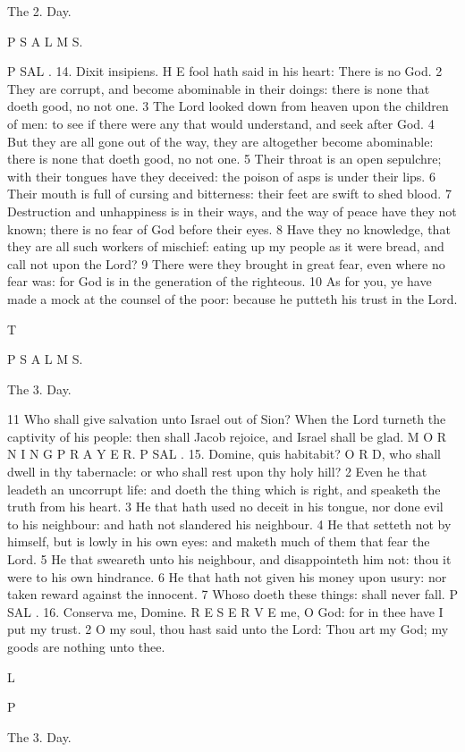 The 2. Day.

P S A L M S.

P SAL . 14. Dixit insipiens. H E fool hath said in his heart: There is no God. 2 They are corrupt, and become abominable in their doings: there is none that doeth good, no not one. 3 The Lord looked down from heaven upon the children of men: to see if there were any that would understand, and seek after God. 4 But they are all gone out of the way, they are altogether become abominable: there is none that doeth good, no not one. 5 Their throat is an open sepulchre; with their tongues have they deceived: the poison of asps is under their lips. 6 Their mouth is full of cursing and bitterness: their feet are swift to shed blood. 7 Destruction and unhappiness is in their ways, and the way of peace have they not known; there is no fear of God before their eyes. 8 Have they no knowledge, that they are all such workers of mischief: eating up my people as it were bread, and call not upon the Lord? 9 There were they brought in great fear, even where no fear was: for God is in the generation of the righteous. 10 As for you, ye have made a mock at the counsel of the poor: because he putteth his trust in the Lord.

T

P S A L M S.

The 3. Day.

11 Who shall give salvation unto Israel out of Sion? When the Lord turneth the captivity of his people: then shall Jacob rejoice, and Israel shall be glad. M O R N I N G P R A Y E R. P SAL . 15. Domine, quis habitabit? O R D, who shall dwell in thy tabernacle: or who shall rest upon thy holy hill? 2 Even he that leadeth an uncorrupt life: and doeth the thing which is right, and speaketh the truth from his heart. 3 He that hath used no deceit in his tongue, nor done evil to his neighbour: and hath not slandered his neighbour. 4 He that setteth not by himself, but is lowly in his own eyes: and maketh much of them that fear the Lord. 5 He that sweareth unto his neighbour, and disappointeth him not: thou it were to his own hindrance. 6 He that hath not given his money upon usury: nor taken reward against the innocent. 7 Whoso doeth these things: shall never fall. P SAL . 16. Conserva me, Domine. R E S E R V E me, O God: for in thee have I put my trust. 2 O my soul, thou hast said unto the Lord: Thou art my God; my goods are nothing unto thee.

L

P

The 3. Day.

